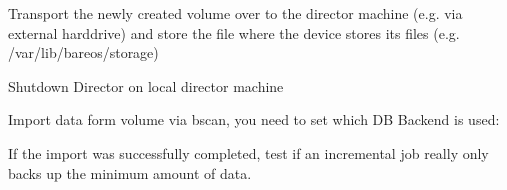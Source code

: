Transport the newly created volume over to the director machine (e.g. via external harddrive)
and store the file where the device stores its files (e.g. /var/lib/bareos/storage)

Shutdown Director on local director machine

Import data form volume via bscan, you need to set which DB Backend is used:


If the import was successfully completed, test if an incremental job really only backs up
the minimum amount of data.


